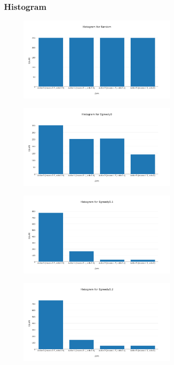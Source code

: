\documentclass[11pt]{article}
\begin{document}
\subsubsection{Histogram}

\begin{figure}[H]
   \centering
   \includegraphics[width=0.7\textwidth]{img/1-1/h1.png}
\end{figure}

\begin{figure}[H]
   \centering
   \includegraphics[width=0.7\textwidth]{img/1-1/h2.png}
\end{figure}

\begin{figure}[H]
   \centering
   \includegraphics[width=0.7\textwidth]{img/1-1/h3.png}
\end{figure}

\begin{figure}[H]
   \centering
   \includegraphics[width=0.7\textwidth]{img/1-1/h4.png}
\end{figure}
\end{document}
